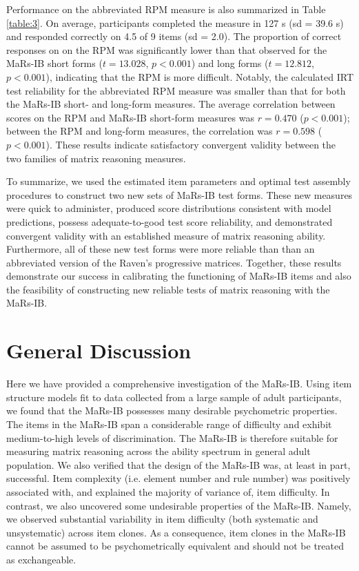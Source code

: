 \documentclass[a4paper,man,natbib]{apa6}
\begin{document}
Performance on the abbreviated RPM measure is also summarized in Table \ref{table:3}. On average, participants completed the measure in 127 s (sd = 39.6 s) and responded correctly on 4.5 of 9 items (sd = 2.0). The proportion of correct responses on on the RPM was significantly lower than that observed for the MaRs-IB short forms ($t = 13.028$, $p < 0.001$) and long forms ($t = 12.812$,  $p < 0.001$), indicating that the RPM is more difficult. Notably, the calculated IRT test reliability for the abbreviated RPM measure was smaller than that for both the MaRs-IB short- and long-form measures. The average correlation between scores on the RPM and MaRs-IB short-form measures was $r = 0.470$ ($p < 0.001$); between the RPM and long-form measures, the correlation was $r = 0.598$ ($p < 0.001$). These results indicate satisfactory convergent validity between the two families of matrix reasoning measures. 

To summarize, we used the estimated item parameters and optimal test assembly procedures to construct two new sets of MaRs-IB test forms. These new measures were quick to administer, produced score distributions consistent with model predictions, possess adequate-to-good test score reliability, and demonstrated convergent validity with an established measure of matrix reasoning ability. Furthermore, all of these new test forms were more reliable than than an abbreviated version of the Raven's progressive matrices. Together, these results demonstrate our success in calibrating the functioning of MaRs-IB items and also the feasibility of constructing new reliable tests of matrix reasoning with the MaRs-IB.

\section{General Discussion}

Here we have provided a comprehensive investigation of the MaRs-IB. Using item structure models fit to data collected from a large sample of adult participants, we found that the MaRs-IB possesses many desirable psychometric properties. The items in the MaRs-IB span a considerable range of difficulty and exhibit medium-to-high levels of discrimination. The MaRs-IB is therefore suitable for measuring matrix reasoning across the ability spectrum in general adult population. We also verified that the design of the MaRs-IB was, at least in part, successful. Item complexity (i.e. element number and rule number) was positively associated with, and explained the majority of variance of, item difficulty. In contrast, we also uncovered some undesirable properties of the MaRs-IB. Namely, we observed substantial variability in item difficulty (both systematic and unsystematic) across item clones. As a consequence, item clones in the MaRs-IB cannot be assumed to be psychometrically equivalent and should not be treated as exchangeable.
\end{document}
